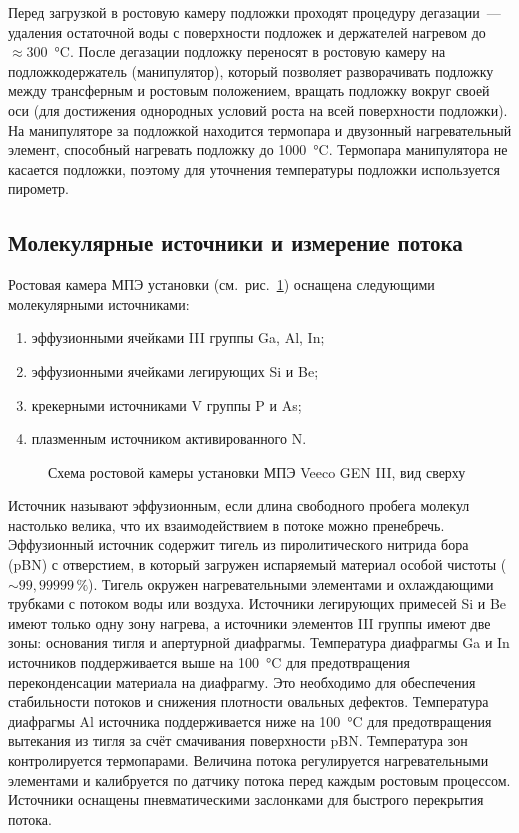 Перед загрузкой в ростовую камеру подложки проходят процедуру дегазации~---
удаления остаточной воды с поверхности подложек и держателей нагревом до
\(\approx 300\)~\si{\degreeCelsius}. После дегазации подложку переносят в
ростовую камеру на подложкодержатель (манипулятор), который позволяет
разворачивать подложку между трансферным и ростовым положением, вращать
подложку вокруг своей оси (для достижения однородных условий роста на всей
поверхности подложки). На манипуляторе за подложкой находится термопара и
двузонный нагревательный элемент, способный нагревать подложку до
1000~\si{\degreeCelsius}. Термопара манипулятора не касается подложки, поэтому
для уточнения температуры подложки используется пирометр.

\subsection{Молекулярные источники и измерение потока}\label{sec:ch2/sec1/sub1}

Ростовая камера МПЭ установки (см.~рис.~\cref{fig:Image_11}) оснащена
следующими молекулярными источниками:

\begin{enumerate}[beginpenalty=10000] \item эффузионными ячейками III группы
	Ga, Al, In; \item эффузионными ячейками легирующих Si и Be; \item крекерными
	источниками V группы P и As; \item плазменным источником активированного N.
	\end{enumerate}

\begin{figure}[ht]  \caption{Схема ростовой камеры установки МПЭ Veeco GEN III, вид
сверху}\label{fig:Image_11} \end{figure}

Источник называют эффузионным, если длина свободного пробега молекул настолько
велика, что их взаимодействием в потоке можно пренебречь. Эффузионный источник
содержит тигель из пиролитического нитрида бора (pBN) с отверстием, в который
загружен испаряемый материал особой чистоты (\(\sim 99,99999\,\%\)). Тигель
окружен нагревательными элементами и охлаждающими трубками с потоком воды или
воздуха. Источники легирующих примесей Si и Be имеют только одну зону нагрева,
а источники элементов III группы имеют две зоны: основания тигля и апертурной
диафрагмы. Температура диафрагмы Ga и In источников поддерживается выше на
100~\si{\degreeCelsius} для предотвращения переконденсации материала на
диафрагму. Это необходимо для обеспечения стабильности потоков и снижения
плотности овальных дефектов. Температура диафрагмы Al источника поддерживается
ниже на 100~\si{\degreeCelsius} для предотвращения вытекания из тигля за счёт
смачивания поверхности pBN. Температура зон контролируется термопарами.
Величина потока регулируется нагревательными элементами и калибруется по
датчику потока перед каждым ростовым процессом. Источники оснащены
пневматическими заслонками для быстрого перекрытия потока.

